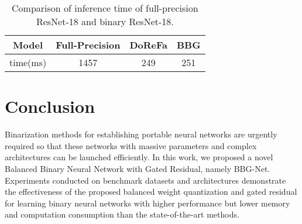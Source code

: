 \documentclass{article}
\begin{document}
\begin{table}[h]
	\vspace{-0.2in}
	\centering
	\small
	\caption{Comparison of inference time of full-precision ResNet-18 and binary ResNet-18.}
	\vspace{0.3em}
	\renewcommand\arraystretch{1.0}
	\begin{tabular}{|c||c|c|c|}
		\hline
		Model&Full-Precision&DoReFa&BBG\\
		\hline
		\hline
		time(ms)&1457&249&251\\
		\hline
	\end{tabular}
\vspace{-0.35in}
	\label{efficiency}\end{table}
\section{Conclusion}
Binarization methods for establishing portable neural networks are urgently required so that these networks with massive parameters and complex architectures can be launched efficiently. In this work, we proposed a novel Balanced Binary Neural Network with Gated Residual, namely BBG-Net. Experiments conducted on benchmark datasets and architectures demonstrate the effectiveness of the proposed balanced weight quantization and gated residual for learning binary neural networks with higher performance but lower memory and computation consumption than the state-of-the-art methods.


\end{document}
